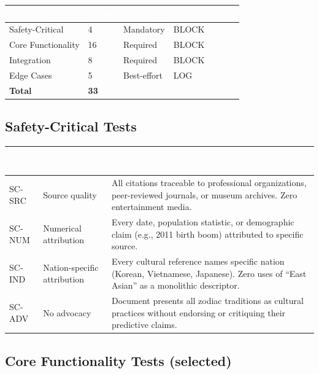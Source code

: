 \documentclass[11pt,letterpaper]{article}
\newcommand{\tableheader}[1]{\textbf{\sffamily\textcolor{white}{#1}}}
\begin{document}
\begin{center}
\begin{tabularx}{\textwidth}{L{3cm}C{1.5cm}C{2cm}L{4cm}}
\toprule
{}
\tableheader{Category} & \tableheader{Count} & \tableheader{Priority} & \tableheader{Failure Action} \\
\midrule
Safety-Critical & 4 & Mandatory & BLOCK \\
Core Functionality & 16 & Required & BLOCK \\
Integration & 8 & Required & BLOCK \\
Edge Cases & 5 & Best-effort & LOG \\
\midrule
\textbf{Total} & \textbf{33} & & \\
\bottomrule
\end{tabularx}
\end{center}

\subsection{Safety-Critical Tests}

\begin{center}
\begin{tabularx}{\textwidth}{C{1.5cm}L{3.5cm}X}
\toprule
{}
\tableheader{Test ID} & \tableheader{Verifies} & \tableheader{Expected Behavior} \\
\midrule
SC-SRC & Source quality & All citations traceable to professional organizations, peer-reviewed journals, or museum archives. Zero entertainment media. \\
SC-NUM & Numerical attribution & Every date, population statistic, or demographic claim (e.g., 2011 birth boom) attributed to specific source. \\
SC-IND & Nation-specific attribution & Every cultural reference names specific nation (Korean, Vietnamese, Japanese). Zero uses of ``East Asian'' as a monolithic descriptor. \\
SC-ADV & No advocacy & Document presents all zodiac traditions as cultural practices without endorsing or critiquing their predictive claims. \\
\bottomrule
\end{tabularx}
\end{center}

\subsection{Core Functionality Tests (selected)}
\end{document}
